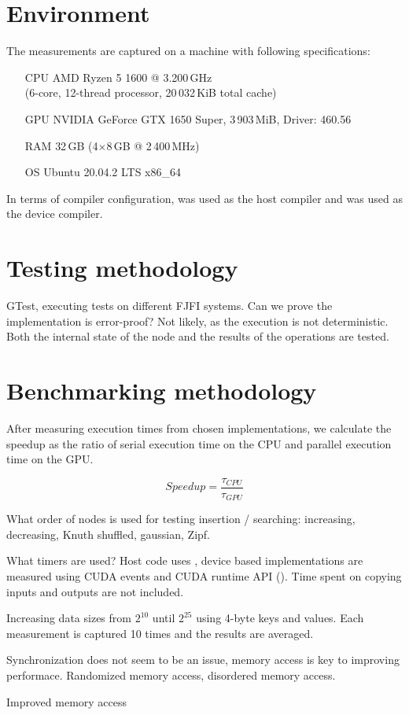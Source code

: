 \section{Environment}

The measurements are captured on a machine with following specifications:

\begin{itemize}
  \item[CPU]{AMD Ryzen 5 1600 @ 3.200\,GHz \\ (6-core, 12-thread processor, 20\,032\,KiB total cache)}
  \item[GPU]{NVIDIA GeForce GTX 1650 Super, 3\,903\,MiB, Driver: 460.56}
  \item[RAM]{32\,GB (4$\times$8\,GB @ 2\,400\,MHz)}
  \item[OS]{Ubuntu 20.04.2 LTS x86\_64}
\end{itemize}

In terms of compiler configuration,  was used as the host compiler and  was used as the device compiler.

\section{Testing methodology}

GTest, executing tests on different FJFI systems. Can we prove the implementation is error-proof? Not likely, as the execution is not deterministic. Both the internal state of the node and the results of the operations are tested.

\section{Benchmarking methodology}

After measuring execution times from chosen implementations, we calculate the speedup as the ratio of serial execution time on the CPU and parallel execution time on the GPU.

$$\mathit{Speedup} = \frac{\tau_{\mathit{CPU}}}{\tau_{\mathit{GPU}}}$$

What order of nodes is used for testing insertion / searching: increasing, decreasing, Knuth shuffled, gaussian, Zipf.

What timers are used? Host code uses , device based implementations are measured using CUDA events and CUDA runtime API (). Time spent on copying inputs and outputs are not included. 

Increasing data sizes from $2^10$ until $2^25$ using 4-byte keys and values. Each measurement is captured 10 times and the results are averaged.

Synchronization does not seem to be an issue, memory access is key to improving performace. Randomized memory access, disordered memory access. 

 Improved memory access
